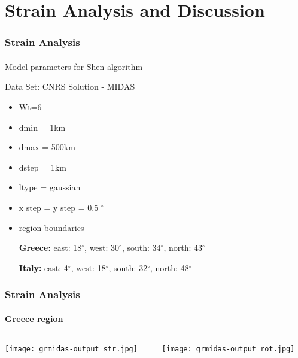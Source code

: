 \section{Strain Analysis and Discussion}
 
\graphicspath{{Chapter4/Figs/}}

\begin{frame}
 \frametitle{Strain Analysis}
 \framesubtitle{}
 \label{ch4:}
 
  Model parameters for Shen algorithm
  
  Data Set: CNRS Solution - MIDAS
  \begin{itemize}
    \item Wt=6
    \item dmin = 1km
    \item dmax = 500km
    \item dstep = 1km
    \item ltype = gaussian
    \item x step = y step = 0.5 $^{\circ}$
    \item \underline{region boundaries}
    
    \textbf{Greece:} east: 18$^{\circ}$, west: 30$^{\circ}$, south: 34$^{\circ}$, north: 43$^{\circ}$
    
    \textbf{Italy:} east: 4$^{\circ}$, west: 18$^{\circ}$, south: 32$^{\circ}$, north: 48$^{\circ}$
  \end{itemize}

\end{frame}
\note{}

\begin{frame}
  \frametitle{Strain Analysis}
  \framesubtitle{Greece region}
  \label{ch4:}
   
  \begin{columns}
    \begin{column}{0.5\textwidth}
      \begin{center}
        \texttt{[image: grmidas-output\_str.jpg]}   
      \end{center}
    \end{column}
    \begin{column}{0.5\textwidth}
      \begin{center}
        \texttt{[image: grmidas-output\_rot.jpg]}     
      \end{center}
    \end{column}
  \end{columns}

\end{frame}
\note{}

